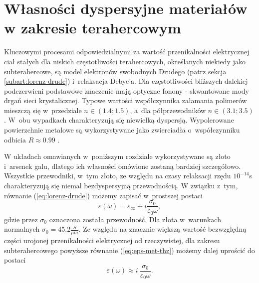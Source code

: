 \section{Własności dyspersyjne materiałów w zakresie terahercowym}
\label{subart:thzmat}
Kluczowymi procesami odpowiedzialnymi za wartość przenikalności elektrycznej ciał stałych dla niskich częstotliwości terahercowych, określanych niekiedy jako subterahercowe, są model elektronów swobodnych Drudego (patrz sekcja \ref{subart:lorenz-drude}) i~relaksacja Debye'a. Dla częstotliwości bliższych dalekiej podczerwieni podstawowe znaczenie mają optyczne fonony - skwantowane mody drgań sieci krystalicznej. Typowe wartości współczynnika załamania polimerów mieszczą się w~przedziale $n \in (1.4;1.5)$, a~dla półprzewodników $n\in (3.1;3.5)$. W~obu wypadkach charakteryzują się niewielką dyspersją. Wypolerowane powierzchnie metalowe są wykorzystywane jako zwierciadła o~współczynniku odbicia $R\approx 0.99$ \cite{lee2009principles}.

W układach omawianych w~poniższym rozdziale wykorzystywane są złoto i~arsenek galu, dlatego ich własności omówione zostaną bardziej szczegółowo. Wszystkie przewodniki, w~tym złoto, ze względu na czasy relaksacji rzędu $10^{-14}$s charakteryzują się niemal bezdyspersyjną przewodnością. W związku z~tym, równanie (\ref{eq:lorenz-drude}) możemy zapisać w~prostszej postaci
\begin{equation}
	\varepsilon(\omega)=\varepsilon_{\infty}+i \frac{\sigma_0}{\varepsilon_0 \omega},
	\label{eq:eps-met-thz}
\end{equation}
gdzie przez $\sigma_0$ oznaczona została przewodność. Dla złota w~warunkach normalnych $\sigma_0=45.2 \frac{S}{\mu m}$.   Ze względu na znacznie większą wartość bezwzględną części urojonej przenikalności elektrycznej od rzeczywistej, dla zakresu subterahercowego powyższe równanie (\ref{eq:eps-met-thz}) możemy dalej uprościć do postaci
\begin{equation}
	\varepsilon(\omega) \approx i~\frac{\sigma_0}{\varepsilon_0 \omega}.
	\label{eq:eps-met-thz-app}
\end{equation}

